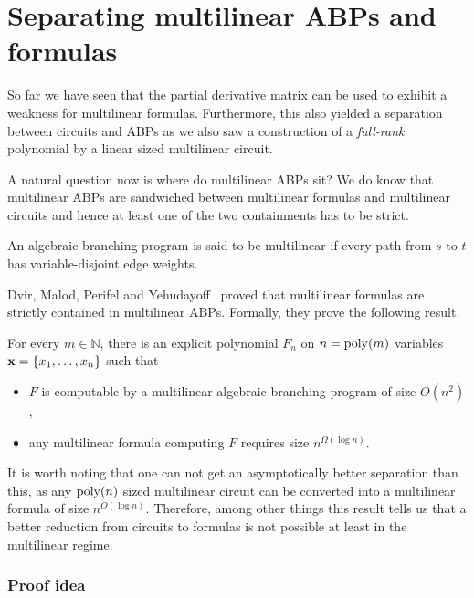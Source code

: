 \chapter{Separating multilinear ABPs and formulas}\label{chap:DMPY}

So far we have seen that the partial derivative matrix can be used to exhibit a weakness for multilinear formulas.
Furthermore, this also yielded a separation between circuits and ABPs as we also saw a construction of a \emph{full-rank} polynomial by a linear sized multilinear circuit.

A natural question now is where do multilinear ABPs sit? We do know that multilinear ABPs are sandwiched between multilinear formulas and multilinear circuits and hence at least one of the two containments has to be strict.

\begin{definition}
An algebraic branching program is said to be multilinear if every path from $s$ to $t$ has variable-disjoint edge weights. 
\end{definition}

Dvir, Malod, Perifel and Yehudayoff~\cite{dmpy12} proved that multilinear formulas are strictly contained in multilinear ABPs. Formally, they prove the following result.

\begin{theorem}
\label{thm:separation}
For every $m \in \mathbb{N}$, there is an explicit polynomial $F_n$ on $n = \operatorname{poly}(m)$ variables $\mathbf{x} = \left\{x_1,\ldots,x_n\right\}$ such that
\begin{itemize}
\item $F$ is computable by a multilinear algebraic branching program of size $O(n^2)$,
\item any multilinear formula computing $F$ requires size $n^{\Omega(\log n)}$.
\end{itemize}
\end{theorem}

It is worth noting that one can not get an asymptotically better separation than this, as any $\operatorname{poly}(n)$ sized multilinear circuit can be converted into a multilinear formula of size $n^{O(\log n)}$.
Therefore, among other things this result tells us that a better reduction from circuits to formulas is not possible at least in the multilinear regime.

\subsection*{Proof idea}


